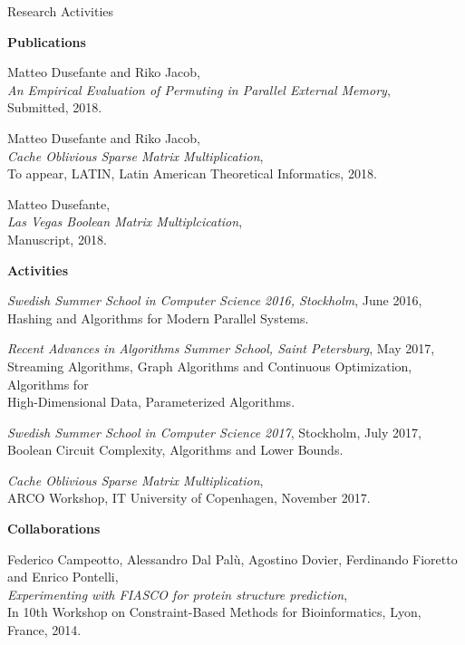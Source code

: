 \documentclass{resume} %
\begin{document}
\begin{rSection}{Research Activities}


{\bf Publications}

Matteo Dusefante and Riko Jacob,\\
\emph{An Empirical Evaluation of Permuting in Parallel External Memory},\\
Submitted, 2018.

Matteo Dusefante and Riko Jacob,\\
\emph{Cache Oblivious Sparse Matrix Multiplication},\\ 
To appear, LATIN, Latin American Theoretical Informatics, 2018.

Matteo Dusefante,\\
\emph{Las Vegas Boolean Matrix Multiplcication},\\ 
Manuscript, 2018.

{\bf Activities}

\emph{Swedish Summer School in Computer Science 2016, Stockholm}, June 2016,\\
\ind Hashing and Algorithms for Modern Parallel Systems.

\emph{Recent Advances in Algorithms Summer School, Saint Petersburg}, May 2017,\\
\ind Streaming Algorithms, Graph Algorithms and Continuous Optimization, Algorithms for \\ \ind High-Dimensional Data, Parameterized Algorithms.

\emph{Swedish Summer School in Computer Science 2017}, Stockholm, July 2017,\\
\ind Boolean Circuit Complexity, Algorithms and Lower Bounds.

\emph{Cache Oblivious Sparse Matrix Multiplication}, \\
\ind ARCO Workshop, IT University of Copenhagen, November 2017.
 

{\bf Collaborations}

Federico Campeotto, Alessandro Dal Palù, Agostino Dovier, Ferdinando Fioretto and Enrico Pontelli,\\
\emph{Experimenting with FIASCO for protein structure prediction},\\
In 10th Workshop on Constraint-Based Methods for Bioinformatics, Lyon, France, 2014.


\end{rSection}


\end{document}
